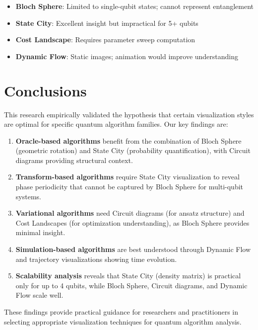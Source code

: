 \documentclass[12pt,a4paper]{article}
\begin{document}
\begin{itemize}
	\item \textbf{Bloch Sphere}: Limited to single-qubit states; cannot represent entanglement
	\item \textbf{State City}: Excellent insight but impractical for 5+ qubits
	\item \textbf{Cost Landscape}: Requires parameter sweep computation
	\item \textbf{Dynamic Flow}: Static images; animation would improve understanding
\end{itemize}

\newpage

\section{Conclusions}

This research empirically validated the hypothesis that certain visualization styles are optimal for specific quantum algorithm families. Our key findings are:

\begin{enumerate}
	\item \textbf{Oracle-based algorithms} benefit from the combination of Bloch Sphere (geometric rotation) and State City (probability quantification), with Circuit diagrams providing structural context.

	\item \textbf{Transform-based algorithms} require State City visualization to reveal phase periodicity that cannot be captured by Bloch Sphere for multi-qubit systems.

	\item \textbf{Variational algorithms} need Circuit diagrams (for ansatz structure) and Cost Landscapes (for optimization understanding), as Bloch Sphere provides minimal insight.

	\item \textbf{Simulation-based algorithms} are best understood through Dynamic Flow and trajectory visualizations showing time evolution.

	\item \textbf{Scalability analysis} reveals that State City (density matrix) is practical only for up to 4 qubits, while Bloch Sphere, Circuit diagrams, and Dynamic Flow scale well.
\end{enumerate}

These findings provide practical guidance for researchers and practitioners in selecting appropriate visualization techniques for quantum algorithm analysis.
\end{document}
